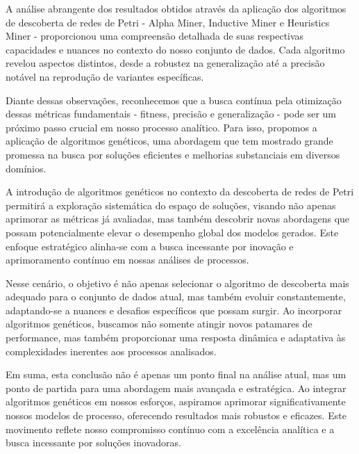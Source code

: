 \documentclass[tcc2]{classe_uftex/uftex}
\begin{document}
 A análise abrangente dos resultados obtidos através da aplicação dos algoritmos de descoberta de redes de Petri - Alpha Miner, Inductive Miner e Heuristics Miner - proporcionou uma compreensão detalhada de suas respectivas capacidades e nuances no contexto do nosso conjunto de dados. Cada algoritmo revelou aspectos distintos, desde a robustez na generalização até a precisão notável na reprodução de variantes específicas.

Diante dessas observações, reconhecemos que a busca contínua pela otimização dessas métricas fundamentais - fitness, precisão e generalização - pode ser um próximo passo crucial em nosso processo analítico. Para isso, propomos a aplicação de algoritmos genéticos, uma abordagem que tem mostrado grande promessa na busca por soluções eficientes e melhorias substanciais em diversos domínios.

A introdução de algoritmos genéticos no contexto da descoberta de redes de Petri permitirá a exploração sistemática do espaço de soluções, visando não apenas aprimorar as métricas já avaliadas, mas também descobrir novas abordagens que possam potencialmente elevar o desempenho global dos modelos gerados. Este enfoque estratégico alinha-se com a busca incessante por inovação e aprimoramento contínuo em nossas análises de processos.

Nesse cenário, o objetivo é não apenas selecionar o algoritmo de descoberta mais adequado para o conjunto de dados atual, mas também evoluir constantemente, adaptando-se a nuances e desafios específicos que possam surgir. Ao incorporar algoritmos genéticos, buscamos não somente atingir novos patamares de performance, mas também proporcionar uma resposta dinâmica e adaptativa às complexidades inerentes aos processos analisados.

Em suma, esta conclusão não é apenas um ponto final na análise atual, mas um ponto de partida para uma abordagem mais avançada e estratégica. Ao integrar algoritmos genéticos em nossos esforços, aspiramos aprimorar significativamente nossos modelos de processo, oferecendo resultados mais robustos e eficazes. Este movimento reflete nosso compromisso contínuo com a excelência analítica e a busca incessante por soluções inovadoras.



\backmatter 
\singlespacing   


\appendix
\onehalfspacing
\end{document}
